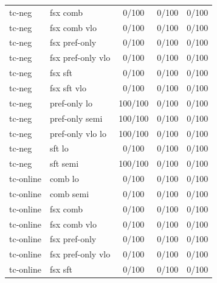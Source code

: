 \documentclass[10pt,landscape]{article}
\begin{document}
\begin{tabular}{llccc}
tc-neg & fsx comb & \cellcolor{missing}0/100 & \cellcolor{missing}0/100 & \cellcolor{missing}0/100 \\
tc-neg & fsx comb vlo & \cellcolor{missing}0/100 & \cellcolor{missing}0/100 & \cellcolor{missing}0/100 \\
tc-neg & fsx pref-only & \cellcolor{missing}0/100 & \cellcolor{missing}0/100 & \cellcolor{missing}0/100 \\
tc-neg & fsx pref-only vlo & \cellcolor{missing}0/100 & \cellcolor{missing}0/100 & \cellcolor{missing}0/100 \\
tc-neg & fsx sft & \cellcolor{missing}0/100 & \cellcolor{missing}0/100 & \cellcolor{missing}0/100 \\
tc-neg & fsx sft vlo & \cellcolor{missing}0/100 & \cellcolor{missing}0/100 & \cellcolor{missing}0/100 \\
tc-neg & pref-only lo & \cellcolor{done}100/100 & \cellcolor{missing}0/100 & \cellcolor{missing}0/100 \\
tc-neg & pref-only semi & \cellcolor{done}100/100 & \cellcolor{missing}0/100 & \cellcolor{missing}0/100 \\
tc-neg & pref-only vlo lo & \cellcolor{done}100/100 & \cellcolor{missing}0/100 & \cellcolor{missing}0/100 \\
tc-neg & sft lo & \cellcolor{missing}0/100 & \cellcolor{missing}0/100 & \cellcolor{missing}0/100 \\
tc-neg & sft semi & \cellcolor{done}100/100 & \cellcolor{missing}0/100 & \cellcolor{missing}0/100 \\
tc-online & comb lo & \cellcolor{missing}0/100 & \cellcolor{missing}0/100 & \cellcolor{missing}0/100 \\
tc-online & comb semi & \cellcolor{missing}0/100 & \cellcolor{missing}0/100 & \cellcolor{missing}0/100 \\
tc-online & fsx comb & \cellcolor{missing}0/100 & \cellcolor{missing}0/100 & \cellcolor{missing}0/100 \\
tc-online & fsx comb vlo & \cellcolor{missing}0/100 & \cellcolor{missing}0/100 & \cellcolor{missing}0/100 \\
tc-online & fsx pref-only & \cellcolor{missing}0/100 & \cellcolor{missing}0/100 & \cellcolor{missing}0/100 \\
tc-online & fsx pref-only vlo & \cellcolor{missing}0/100 & \cellcolor{missing}0/100 & \cellcolor{missing}0/100 \\
tc-online & fsx sft & \cellcolor{missing}0/100 & \cellcolor{missing}0/100 & \cellcolor{missing}0/100 \\

\end{tabular}
\end{document}

